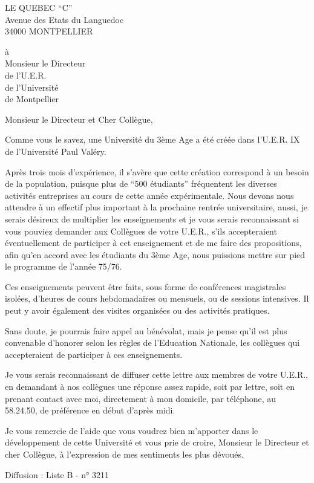 LE QUEBEC ``C''\\
Avenue des Etats du Languedoc\\
34000 MONTPELLIER

à\\
Monsieur le Directeur\\
de l'U.E.R.\\
de l'Université\\
de Montpellier

Monsieur le Directeur et Cher Collègue,

Comme vous le savez, une Université du 3ème Age a été créée dans l'U.E.R. IX de l'Université Paul Valéry.

Après trois mois d'expérience, il s'avère que cette création correspond à un besoin de la population, puisque plus de ``500 étudiants'' fréquentent les diverses activités entreprises au cours de cette année expérimentale. Nous devons nous attendre à un effectif plus important à la prochaine rentrée universitaire, aussi, je serais désireux de multiplier les enseignements et je vous serais reconnaissant si vous pouviez demander aux Collègues de votre U.E.R., s'ils accepteraient éventuellement de participer à cet enseignement et de me faire des propositions, afin qu'en accord avec les étudiants du 3ème Age, nous puissions mettre sur pied le programme de l'année 75/76.

Ces enseignements peuvent être faits, sous forme de conférences magistrales isolées, d'heures de cours hebdomadaires ou mensuels, ou de sessions intensives. Il peut y avoir également des visites organisées ou des activités pratiques.

Sans doute, je pourrais faire appel au bénévolat, mais je pense qu'il est plus convenable d'honorer selon les règles de l'Education Nationale, les collègues qui accepteraient de participer à ces enseignements.

Je vous serais reconnaissant de diffuser cette lettre aux membres de votre U.E.R., en demandant à nos collègues une réponse assez rapide, soit par lettre, soit en prenant contact avec moi, directement à mon domicile, par téléphone, au 58.24.50, de préférence en début d'après midi.

Je vous remercie de l'aide que vous voudrez bien m'apporter dans le développement de cette Université et vous prie de croire, Monsieur le Directeur et cher Collègue, à l'expression de mes sentiments les plus dévoués.

Diffusion : Liste B - n° 3211

